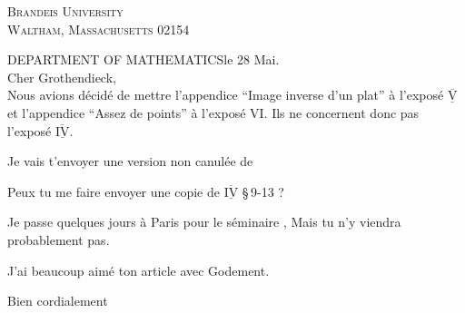 \begin{center}
\textsc{Brandeis University}\\
\textsc{Waltham, Massachusetts 02154}
\end{center}
\noindent DEPARTMENT OF MATHEMATICS\hfill le 28 Mai.\\

Cher Grothendieck,\\

Nous avions décidé de mettre l'appendice ``Image inverse d'un plat'' à l'exposé $\underline{\overline{\mathrm{V}}}$ et l'appendice ``Assez de points'' à l'exposé VI. Ils ne concernent donc pas l'exposé $\underline{\overline{\mathrm{IV}}}$.

Je vais t'envoyer une version non canulée de  

Peux tu me faire envoyer une copie de $\underline{\overline{\mathrm{IV}}}$ \S\,9-13 ?

Je passe quelques jours à Paris pour le \unsure{:}  séminaire , Mais tu n'y viendra probablement pas.

J'ai beaucoup aimé ton article avec Godement.

\begin{flushright}
Bien cordialement\\
\\
\end{flushright}
